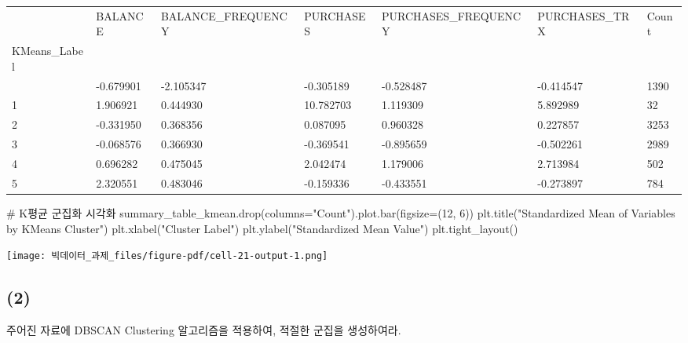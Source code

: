 \documentclass[
  a4paper,
  DIV=11,
  numbers=noendperiod]{scrreprt}
\newenvironment{Shaded}{\begin{snugshade}}{\end{snugshade}}
\newcommand{\CommentTok}[1]{\textcolor[rgb]{0.37,0.37,0.37}{#1}}
\newcommand{\DecValTok}[1]{\textcolor[rgb]{0.68,0.00,0.00}{#1}}
\newcommand{\NormalTok}[1]{\textcolor[rgb]{0.00,0.23,0.31}{#1}}
\newcommand{\OperatorTok}[1]{\textcolor[rgb]{0.37,0.37,0.37}{#1}}
\newcommand{\StringTok}[1]{\textcolor[rgb]{0.13,0.47,0.30}{#1}}
\begin{document}
\begin{longtable}[]{@{}lllllll@{}}
\toprule\noalign{}
& BALANCE & BALANCE\_FREQUENCY & PURCHASES & PURCHASES\_FREQUENCY &
PURCHASES\_TRX & Count \\
KMeans\_Label & & & & & & \\
\midrule\noalign{}
\endhead
\bottomrule\noalign{}
\endlastfoot
0 & -0.679901 & -2.105347 & -0.305189 & -0.528487 & -0.414547 & 1390 \\
1 & 1.906921 & 0.444930 & 10.782703 & 1.119309 & 5.892989 & 32 \\
2 & -0.331950 & 0.368356 & 0.087095 & 0.960328 & 0.227857 & 3253 \\
3 & -0.068576 & 0.366930 & -0.369541 & -0.895659 & -0.502261 & 2989 \\
4 & 0.696282 & 0.475045 & 2.042474 & 1.179006 & 2.713984 & 502 \\
5 & 2.320551 & 0.483046 & -0.159336 & -0.433551 & -0.273897 & 784 \\
\end{longtable}

\begin{Shaded}
\begin{Highlighting}[]
\CommentTok{\# K평균 군집화 시각화}
\NormalTok{summary\_table\_kmean.drop(columns}\OperatorTok{=}\StringTok{"Count"}\NormalTok{).plot.bar(figsize}\OperatorTok{=}\NormalTok{(}\DecValTok{12}\NormalTok{, }\DecValTok{6}\NormalTok{))}
\NormalTok{plt.title(}\StringTok{"Standardized Mean of Variables by KMeans Cluster"}\NormalTok{)}
\NormalTok{plt.xlabel(}\StringTok{"Cluster Label"}\NormalTok{)}
\NormalTok{plt.ylabel(}\StringTok{"Standardized Mean Value"}\NormalTok{)}
\NormalTok{plt.tight\_layout()}
\end{Highlighting}
\end{Shaded}

\texttt{[image: 빅데이터\_과제\_files/figure-pdf/cell-21-output-1.png]}

\subsection{(2)}\label{section-4}

주어진 자료에 DBSCAN Clustering 알고리즘을 적용하여, 적절한 군집을
생성하여라.
\end{document}
